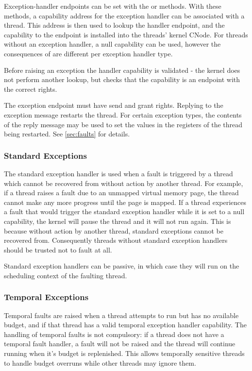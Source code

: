 Exception-handler
endpoints can be set with the  or
 methods.
With these methods, a capability address for the exception handler can be associated with a thread.
This address is then used to lookup the handler endpoint, and the capability to the endpoint is installed into the threads' kernel CNode.
For threads without an exception handler, a null capability can be used, however the consequences of are different per exception handler type.

Before raising an exception the handler capability is validated - the kernel does not perform another lookup, but checks that the capability is an endpoint with the correct rights.

The exception endpoint must have send and grant rights. Replying to the
exception message restarts the thread. For certain exception types, the contents of
the reply message may be used to set the values in the registers of the
thread being restarted.
See \autoref{sec:faults} for details.

\subsubsection{Standard Exceptions}

The standard exception handler is used when a fault is triggered by a thread which cannot be recovered from without action by another thread.
For example, if a thread raises a fault due to an unmapped virtual memory page, the thread cannot make any more progress until the page is mapped.
If a thread experiences a fault that would trigger the standard exception handler while it is set to a null capability, the kernel will pause the thread and it will not run again. 
This is because without action by another thread, standard exceptions cannot be recovered from.
Consequently threads without standard exception handlers should be trusted not to fault at all.

Standard exception handlers can be passive, in which case they will run on the scheduling context of the faulting thread.

\subsubsection{Temporal Exceptions}
\label{sec:temporal-exceptions}

Temporal faults are raised when a thread attempts to run but has no available budget, and if that thread has a valid temporal exception handler capability.
The handling of temporal faults is not compulsory: if a thread does not have a temporal fault handler, a fault will not be raised and the thread will continue running when it's budget is replenished.
This allows temporally sensitive threads to handle budget overruns while other threads may ignore them.

